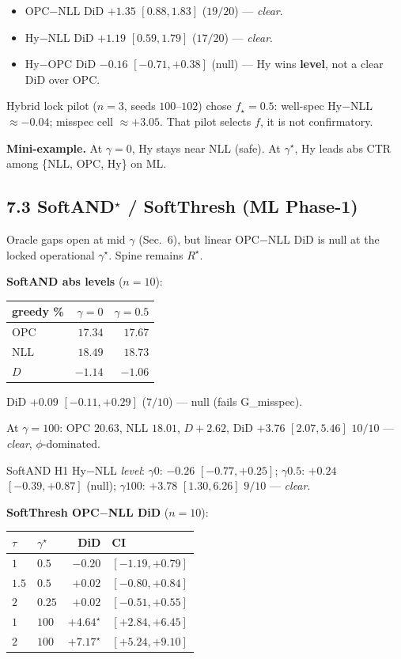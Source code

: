 \documentclass[11pt]{article}
\newcommand{\phonesub}[1]{\Needspace{6\baselineskip}\subsection*{#1}}
\newcommand{\Rstar}{R^{\star}}
\newcommand{\miniex}[1]{\par{\footnotesize\color{black!70}\textbf{Mini-example.} #1\par}}
\begin{document}
\begin{itemize}
  \item OPC$-$NLL DiD $+1.35$ $[0.88,1.83]$
        ($19/20$) --- \emph{clear}.
  \item Hy$-$NLL DiD $+1.19$ $[0.59,1.79]$
        ($17/20$) --- \emph{clear}.
  \item Hy$-$OPC DiD $-0.16$ $[-0.71,+0.38]$
        (null) --- Hy wins \textbf{level},
        not a clear DiD over OPC.
\end{itemize}

Hybrid lock pilot ($n{=}3$, seeds
$100$--$102$) chose $f_{\star}{=}0.5$:
well-spec Hy$-$NLL $\approx -0.04$;
misspec cell $\approx +3.05$. That pilot
selects $f$, it is not confirmatory.

\miniex{At $\gamma{=}0$, Hy stays near NLL
(safe). At $\gamma^{\star}$, Hy leads abs CTR
among \{NLL, OPC, Hy\} on ML.}

\phonesub{7.3 SoftAND$^{\star}$ / SoftThresh
(ML Phase-1)}

Oracle gaps open at mid $\gamma$ (Sec.~6),
but linear OPC$-$NLL DiD is null at the
locked operational $\gamma^{\star}$. Spine
remains $\Rstar$.

\textbf{SoftAND abs levels} ($n{=}10$):

{\scriptsize
\begin{tabular}{@{}l rr@{}}
\toprule
greedy \% & $\gamma{=}0$ & $\gamma{=}0.5$ \\
\midrule
OPC & $17.34$ & $17.67$ \\
NLL & $18.49$ & $18.73$ \\
$D$ & $-1.14$ & $-1.06$ \\
\bottomrule
\end{tabular}}

DiD $+0.09$ $[-0.11,+0.29]$ ($7/10$) ---
null (fails G\_misspec).

At $\gamma{=}100$: OPC $20.63$, NLL $18.01$,
$D{+}2.62$, DiD $+3.76$ $[2.07,5.46]$
$10/10$ --- \emph{clear}, $\phi$-dominated.

SoftAND H1 Hy$-$NLL \emph{level}:
$\gamma0$: $-0.26$ $[-0.77,+0.25]$;
$\gamma0.5$: $+0.24$ $[-0.39,+0.87]$
(null); $\gamma100$: $+3.78$ $[1.30,6.26]$
$9/10$ --- \emph{clear}.

\textbf{SoftThresh OPC$-$NLL DiD} ($n{=}10$):

{\scriptsize
\begin{tabular}{@{}ll rl@{}}
\toprule
$\tau$ & $\gamma^{\star}$ & DiD & CI \\
\midrule
$1$ & $0.5$ & $-0.20$ & $[-1.19,+0.79]$ \\
$1.5$ & $0.5$ & $+0.02$ & $[-0.80,+0.84]$ \\
$2$ & $0.25$ & $+0.02$ & $[-0.51,+0.55]$ \\
\midrule
$1$ & $100$ & $+4.64^{\star}$ & $[+2.84,+6.45]$ \\
$2$ & $100$ & $+7.17^{\star}$ & $[+5.24,+9.10]$ \\
\bottomrule
\end{tabular}}
\end{document}
